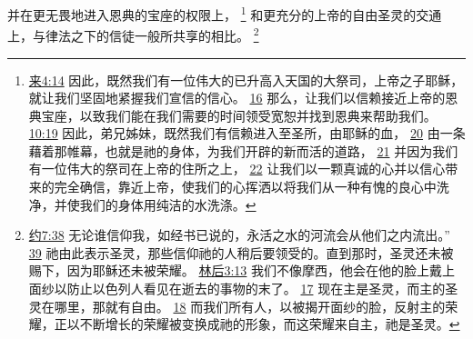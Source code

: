 \documentclass[12pt, a4paper, oneside]{ctexart}
\begin{document}
	并在更无畏地进入恩典的宝座的权限上，
	\footnote {
		\href{https://biblehub.com/hebrews/4-14.htm}{来4:14} 因此，既然我们有一位伟大的已升高入天国的大祭司，上帝之子耶稣，就让我们坚固地紧握我们宣信的信心。
		\href{https://biblehub.com/hebrews/4-16.htm}{16} 那么，让我们以信赖接近上帝的恩典宝座，以致我们能在我们需要的时间领受宽恕并找到恩典来帮助我们。
		\href{https://biblehub.com/hebrews/10-19.htm}{10:19} 因此，弟兄姊妹，既然我们有信赖进入至圣所，由耶稣的血，
		\href{https://biblehub.com/hebrews/10-20.htm}{20} 由一条藉着那帷幕，也就是祂的身体，为我们开辟的新而活的道路，
		\href{https://biblehub.com/hebrews/10-21.htm}{21} 并因为我们有一位伟大的祭司在上帝的住所之上，
		\href{https://biblehub.com/hebrews/10-22.htm}{22} 让我们以一颗真诚的心并以信心带来的完全确信，靠近上帝，使我们的心挥洒以将我们从一种有愧的良心中洗净，并使我们的身体用纯洁的水洗涤。
	}
	和更充分的上帝的自由圣灵的交通上，与律法之下的信徒一般所共享的相比。
	\footnote {
		\href{https://biblehub.com/john/7-38.htm}{约7:38} 无论谁信仰我，如经书已说的，永活之水的河流会从他们之内流出。”
		\href{https://biblehub.com/john/7-39.htm}{39} 祂由此表示圣灵，那些信仰祂的人稍后要领受的。直到那时，圣灵还未被赐下，因为耶稣还未被荣耀。
		\href{https://biblehub.com/2_corinthians/3-13.htm}{林后3:13} 我们不像摩西，他会在他的脸上戴上面纱以防止以色列人看见在逝去的事物的末了。
		\href{https://biblehub.com/2_corinthians/3-17.htm}{17} 现在主是圣灵，而主的圣灵在哪里，那就有自由。
		\href{https://biblehub.com/2_corinthians/3-18.htm}{18} 而我们所有人，以被揭开面纱的脸，反射主的荣耀，正以不断增长的荣耀被变换成祂的形象，而这荣耀来自主，祂是圣灵。
	}
\end{document}
